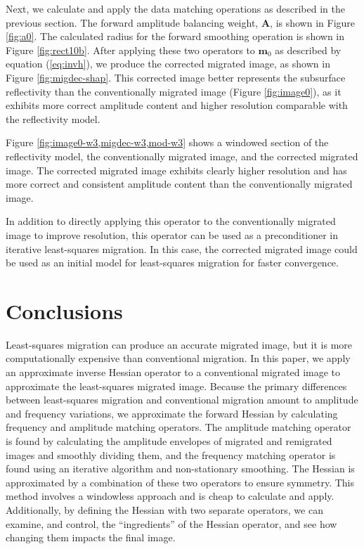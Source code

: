 
    Next, we calculate and apply the data matching operations as described in the previous section. 
    The forward amplitude balancing weight, $\mathbf{A}$, is shown in Figure \ref{fig:a0}.
    The calculated radius for the forward smoothing operation is shown in Figure \ref{fig:rect10b}.
    After applying these two operators to $\mathbf{m}_0$ as described by equation (\ref{eq:invh}), we produce the corrected migrated image, as shown in Figure \ref{fig:migdec-shap}.
    This corrected image better represents the subsurface reflectivity than the conventionally migrated image (Figure \ref{fig:image0}), as it exhibits more correct amplitude content and higher resolution comparable with the reflectivity model.


    Figure \ref{fig:image0-w3,migdec-w3,mod-w3} shows a windowed section of the reflectivity model, the conventionally migrated image, and the corrected migrated image.
    The corrected migrated image exhibits clearly higher resolution and has more correct and consistent amplitude content than the conventionally migrated image.

    In addition to directly applying this operator to the conventionally migrated image to improve resolution, this operator can be used as a preconditioner in iterative least-squares migration.
    In this case, the corrected migrated image could be used as an initial model for least-squares migration for faster convergence.

\section{Conclusions}
    Least-squares migration can produce an accurate migrated image, but it is more computationally expensive than conventional migration.
    In this paper, we apply an approximate inverse Hessian operator to a conventional migrated image to approximate the least-squares migrated image.
    Because the primary differences between least-squares migration and conventional migration amount to amplitude and frequency variations, we approximate the forward Hessian by calculating frequency and amplitude matching operators.
    The amplitude matching operator is found by calculating the amplitude envelopes of migrated and remigrated images and smoothly dividing them, and the frequency matching operator is found using an iterative algorithm and non-stationary smoothing.
    The Hessian is approximated by a combination of these two operators to ensure symmetry.
    This method involves a windowless approach and is cheap to calculate and apply.
    Additionally, by defining the Hessian with two separate operators, we can examine, and control, the ``ingredients'' of the Hessian operator, and see how changing them impacts the final image.

